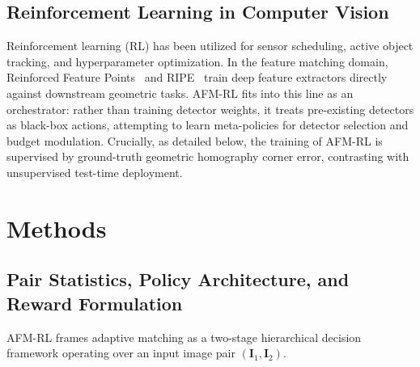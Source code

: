 \documentclass[conference]{IEEEtran}
\begin{document}
\subsection{Reinforcement Learning in Computer Vision}
Reinforcement learning (RL) has been utilized for sensor scheduling, active object tracking, and hyperparameter optimization. In the feature matching domain, Reinforced Feature Points~\cite{bhowmik2020reinforced} and RIPE~\cite{kunzel2025ripe} train deep feature extractors directly against downstream geometric tasks. AFM-RL fits into this line as an orchestrator: rather than training detector weights, it treats pre-existing detectors as black-box actions, attempting to learn meta-policies for detector selection and budget modulation. Crucially, as detailed below, the training of AFM-RL is supervised by ground-truth geometric homography corner error, contrasting with unsupervised test-time deployment.

\section{Methods}
\label{sec:methods}

\subsection{Pair Statistics, Policy Architecture, and Reward Formulation}
AFM-RL frames adaptive matching as a two-stage hierarchical decision framework operating over an input image pair $(\mathbf{I}_1, \mathbf{I}_2)$.
\end{document}
